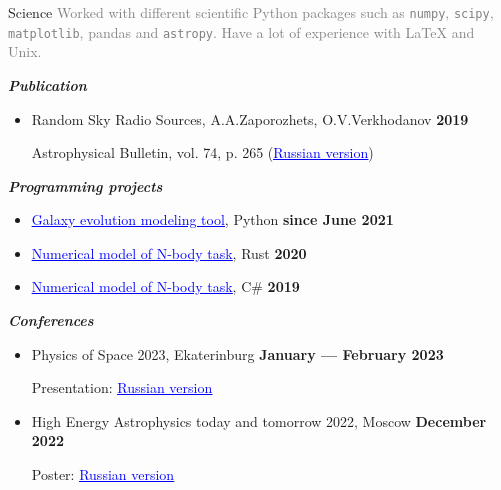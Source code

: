 \documentclass{resume} %
\newcommand{\link}[2]{\href{#1}{\textcolor{blue}{\underline{#2}}}}
\newcommand{\subheader}[1]{\textbf{\textit{#1}}}
\newcommand{\timestamp}[1]{\hfill {\small \textbf{#1}}}
\newcommand{\longversion}[1]{\ifdefined\LONG#1\fi}
\newcommand{\note}[1]{\textcolor{gray}{#1}}
\begin{document}
	\begin{rSection}{Science}
		\longversion{
			\note{
				Worked with different scientific Python packages such as \texttt{numpy}, \texttt{scipy}, \texttt{matplotlib}, pandas and \texttt{astropy}. 
				Have a lot of experience with LaTeX and Unix.
			}
		}

		\subheader{Publication}
		\begin{itemize}
			\item Random Sky Radio Sources, A.A.Zaporozhets, O.V.Verkhodanov \timestamp{2019}
		
			Astrophysical Bulletin, vol. 74, p. 265 (\link{http://www.sao.ru/Doc-k8/Science/Public/Bulletin/Vol74/N3/ASPB265.pdf}{Russian version})
		\end{itemize}

		\vspace{1em}

		\subheader{Programming projects}
		\begin{itemize}
			\item \link{https://github.com/Kraysent/OMTool}{Galaxy evolution modeling tool}, Python \timestamp{since June 2021}
			\item \link{https://github.com/Kraysent/XBodyModel}{Numerical model of N-body task}, Rust \timestamp{2020}
			\item \link{https://github.com/Kraysent/Gravity-Model}{Numerical model of N-body task}, C\# \timestamp{2019}
		\end{itemize}

		\longversion{
			\vspace{1em}

			\subheader{Conferences}
			\begin{itemize}
				\item Physics of Space 2023, Ekaterinburg \timestamp{January --- February 2023}
				
				Presentation: \link{https://www.overleaf.com/read/mnwwgvkqxdky}{Russian version}
				\item High Energy Astrophysics today and tomorrow 2022, Moscow \timestamp{December 2022}
				
				Poster: \link{https://www.overleaf.com/read/cwyptqpmdtdf}{Russian version}
			\end{itemize}
		}
	\end{rSection}
\end{document}
